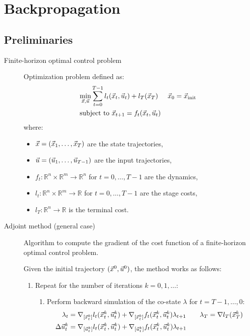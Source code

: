\section{Backpropagation}


\subsection{Preliminaries}

\begin{description}
    \item[Finite-horizon optimal control problem] 
        Optimization problem defined as:
        \[
            \begin{aligned}
                &\min_{{\vec{x}}, {\vec{u}}} \sum_{t=0}^{T-1} l_t({\vec{x}}_t, {\vec{u}}_t) + l_T({\vec{x}}_T) 
                && {\vec{x}}_0 = {\vec{x}}_\text{init} \\
                &\,\text{subject to } {\vec{x}}_{t+1} = f_t({\vec{x}}_t, {\vec{u}}_t) 
            \end{aligned}
        \]
        where:
        \begin{itemize}
            \item ${\vec{x}} = ({\vec{x}}_1, \dots, {\vec{x}}_T)$ are the state trajectories,
            \item ${\vec{u}} = ({\vec{u}}_1, \dots, {\vec{u}}_{T-1})$ are the input trajectories,
            \item $f_t: \mathbb{R}^n \times \mathbb{R}^m \rightarrow \mathbb{R}^n$ for $t=0, \dots, T-1$ are the dynamics,
            \item $l_t: \mathbb{R}^n \times \mathbb{R}^m \rightarrow \mathbb{R}$ for $t=0, \dots, T-1$ are the stage costs,
            \item $l_T: \mathbb{R}^n \rightarrow \mathbb{R}$ is the terminal cost.
        \end{itemize}

    \item[Adjoint method (general case)] 
        Algorithm to compute the gradient of the cost function of a finite-horizon optimal control problem.

        Given the initial trajectory $({\vec{x}}^0, {\vec{u}}^0)$, the method works as follows:
        \begin{enumerate}
            \item Repeat for the number of iterations $k = 0, 1, \dots$:
            \begin{enumerate}
                \item Perform backward simulation of the co-state $\lambda$  for $t = T-1, \dots, 0$:
                \[
                    \begin{split}
                        \lambda_t &= \nabla_{[{\vec{x}}_t^k]} l_t({\vec{x}}_t^k, {\vec{u}}_t^k) + \nabla_{[{\vec{x}}_t^k]} f_t({\vec{x}}_t^k, {\vec{u}}_t^k) \lambda_{t+1} 
                        \qquad 
                        \lambda_T = \nabla l_T({\vec{x}}_T^k) \\
                        \Delta {\vec{u}}_t^k &= \nabla_{[{\vec{u}}_t^k]} l_t({\vec{x}}_t^k, {\vec{u}}_t^k) + \nabla_{[{\vec{u}}_t^k]} f_t({\vec{x}}_t^k, {\vec{u}}_t^k) \lambda_{t+1} 
                    \end{split}
                \]


\end{enumerate}
\end{enumerate}
\end{description}
